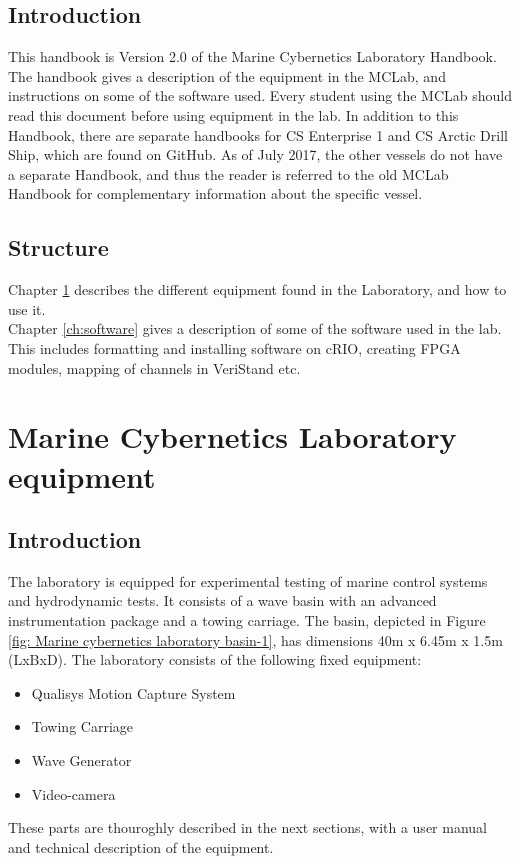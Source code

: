 \documentclass[a4paper,english]{report}
\begin{document}
\setcounter{page}{1}

\vspace*{3cm}

\section*{Introduction}

This handbook is Version 2.0 of the Marine Cybernetics Laboratory Handbook. The handbook gives a description of the equipment in the MCLab, and instructions on some of the software used. Every student using the MCLab should read this document before using equipment in the lab. In addition to this Handbook, there are separate handbooks for CS Enterprise 1 and CS Arctic Drill Ship, which are found on GitHub. As of July 2017, the other vessels do not have a separate Handbook, and thus the reader is referred to the old MCLab Handbook for complementary information about the specific vessel. 

\section*{Structure}
Chapter \ref{ch:marine_cybernetics_laboratory_equipment} describes the different equipment found in the Laboratory, and how to use it. \\
\noindent
Chapter \ref{ch:software} gives a description of some of the software used in the lab. This includes formatting and installing software on cRIO, creating FPGA modules, mapping of channels in VeriStand etc. 

\newpage{}
\tableofcontents{}
\clearpage
{}
\chapter{Marine Cybernetics Laboratory equipment}\label{ch:marine_cybernetics_laboratory_equipment}
\section{Introduction}
The laboratory is equipped for experimental testing of marine control systems and hydrodynamic tests. It consists of a wave basin with an advanced instrumentation package and a towing carriage. The basin, depicted in Figure \ref{fig: Marine cybernetics laboratory basin-1}, has dimensions 40m x 6.45m x 1.5m (LxBxD). The laboratory consists of the following fixed equipment: 
\begin{itemize}
	\item Qualisys Motion Capture System
	\item Towing Carriage
	\item Wave Generator
	\item Video-camera
\end{itemize}
These parts are thouroghly described in the next sections, with a user manual and technical description of the equipment. 
\end{document}
